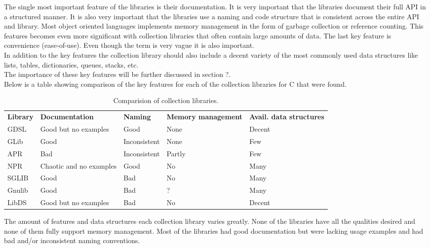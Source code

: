 \documentclass[11pt, letterpaper, twoside, openright]{book}
\begin{document}
    The single most important feature of the libraries is their documentation. It is very important that the libraries document their full API in a structured manner. It is also very important that the libraries use a naming and code structure that is consistent across the entire API and library. Most object oriented languages implements memory management in the form of garbage collection or reference counting. This features becomes even more significant with collection libraries that often contain large amounts of data. The last key feature is convenience (ease-of-use). Even though the term is very vague it is also important.\\

    In addition to the key features the collection library should also include a decent variety of the most commonly used data structures like lists, tables, dictionaries, queues, stacks, etc.\\

    The importance of these key features will be further discussed in section ?.\\

    Below is a table showing comparison of the key features for each of the collection libraries for C that were found.

    \begin{table}[ht]
      \begin{tabular}{ p{1.5cm} l l p{2.5cm} p{2.5cm} }
       \textbf{Library} & \textbf{Documentation} & \textbf{Naming} & \textbf{Memory management} & \textbf{Avail. data structures} \\
       GDSL & Good but no examples & Good & None & Decent \\
       GLib & Good & Inconsistent & None & Few \\
       APR & Bad & Inconsistent & Partly & Few \\
       NPR & Chaotic and no examples & Good & No & Many \\
       SGLIB & Good & Bad & No & Many \\
       Gnulib & Good & Bad & ? & Many \\
       LibDS & Good but no examples & Bad & No & Decent
      \end{tabular}
      \caption{Comparision of collection libraries.}
      \label{tab:collection_library_comparision}
    \end{table}

    The amount of features and data structures each collection library varies greatly. None of the libraries have all the qualities desired and none of them fully support memory management. Most of the libraries had good documentation but were lacking usage examples and had bad and/or inconsistent naming conventions.\\
\end{document}
